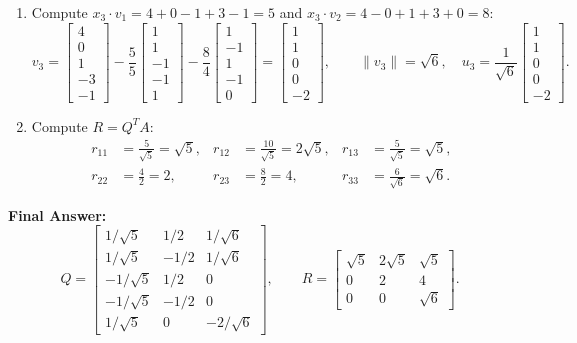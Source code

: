 \documentclass[11pt, letterpaper]{article}
\theoremstyle{definition}
\theoremstyle{remark}
\begin{document}
\begin{enumerate}[label=\textbf{Step \arabic*:}]
\[    \]
    \item Compute $x_3 \cdot v_1 = 4 + 0 - 1 + 3 - 1 = 5$ and $x_3 \cdot v_2 = 4 - 0 + 1 + 3 + 0 = 8$:
    \[
        v_3 = \begin{bmatrix} 4 \\ 0 \\ 1 \\ -3 \\ -1 \end{bmatrix} - \frac{5}{5}\begin{bmatrix} 1 \\ 1 \\ -1 \\ -1 \\ 1 \end{bmatrix} - \frac{8}{4}\begin{bmatrix} 1 \\ -1 \\ 1 \\ -1 \\ 0 \end{bmatrix}
        = \begin{bmatrix} 1 \\ 1 \\ 0 \\ 0 \\ -2 \end{bmatrix}, \qquad \|v_3\| = \sqrt{6}, \quad u_3 = \frac{1}{\sqrt{6}}\begin{bmatrix} 1 \\ 1 \\ 0 \\ 0 \\ -2 \end{bmatrix}.
    \]
    \item Compute $R = Q^T A$:
    \begin{align*}
        r_{11} &= \frac{5}{\sqrt{5}} = \sqrt{5}, & r_{12} &= \frac{10}{\sqrt{5}} = 2\sqrt{5}, & r_{13} &= \frac{5}{\sqrt{5}} = \sqrt{5}, \\
        r_{22} &= \frac{4}{2} = 2, & r_{23} &= \frac{8}{2} = 4, & r_{33} &= \frac{6}{\sqrt{6}} = \sqrt{6}.
    \end{align*}
\end{enumerate}
\textbf{Final Answer:}
\[
    Q = \begin{bmatrix}
        1/\sqrt{5} & 1/2 & 1/\sqrt{6} \\
        1/\sqrt{5} & -1/2 & 1/\sqrt{6} \\
        -1/\sqrt{5} & 1/2 & 0 \\
        -1/\sqrt{5} & -1/2 & 0 \\
        1/\sqrt{5} & 0 & -2/\sqrt{6}
    \end{bmatrix}, \qquad
    R = \begin{bmatrix}
        \sqrt{5} & 2\sqrt{5} & \sqrt{5} \\
        0 & 2 & 4 \\
        0 & 0 & \sqrt{6}
    \end{bmatrix}.
\]
\end{document}
